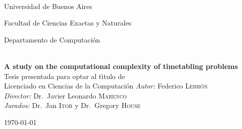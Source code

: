 \begin{titlepage}

\begin{center}


\begin{flushleft}
%
\hfill
{}\\[2.0cm]
\end{flushleft}

{\large \sc Universidad de Buenos Aires

Facultad de Ciencias Exactas y Naturales

Departamento de Computaci\'on} \\[2cm]

{ \LARGE \bfseries A study on the computational complexity of timetabling problems}\\[2.6cm]
{\large Tesis presentada para optar al t\'{\i}tulo de\\
Licenciado en Ciencias de la Computaci\'on}
\vfill
{\large \emph{Autor:} Federico \textsc{Lebrón}\\[0.5cm]
\emph{Director:} 
Dr.~Javier Leonardo \textsc{Marenco} \\[0.5cm]
\emph{Jurados:} 
Dr.~Jan \textsc{Itor} y 
Dr.~Gregory \textsc{House}
}
\vfill

{\large \today}

\end{center}
\end{titlepage}
